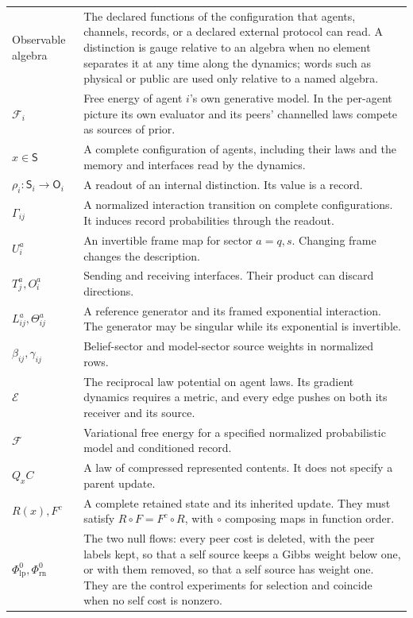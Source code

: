 \begin{longtable}{@{}>{\raggedright\arraybackslash}p{}>{\raggedright\arraybackslash}p{}@{}}
Observable algebra & The declared functions of the configuration that agents, channels, records, or a declared external protocol can read. A distinction is gauge relative to an algebra when no element separates it at any time along the dynamics; words such as physical or public are used only relative to a named algebra.\\
$\mathcal F_i$ & Free energy of agent $i$'s own generative model. In the per-agent picture its own evaluator and its peers' channelled laws compete as sources of prior.\\
$x\in\mathsf S$ & A complete configuration of agents, including their laws and the memory and interfaces read by the dynamics.\\
$\rho_i:\mathsf S_i\to\mathsf O_i$ & A readout of an internal distinction. Its value is a record.\\
$\Gamma_{ij}$ & A normalized interaction transition on complete configurations. It induces record probabilities through the readout.\\
$U_i^a$ & An invertible frame map for sector $a=q,s$. Changing frame changes the description.\\
$T_j^a,O_i^a$ & Sending and receiving interfaces. Their product can discard directions.\\
$L_{ij}^a,\Theta_{ij}^a$ & A reference generator and its framed exponential interaction. The generator may be singular while its exponential is invertible.\\
$\beta_{ij},\gamma_{ij}$ & Belief-sector and model-sector source weights in normalized rows.\\
$\mathcal E$ & The reciprocal law potential on agent laws. Its gradient dynamics requires a metric, and every edge pushes on both its receiver and its source.\\
$\mathcal F$ & Variational free energy for a specified normalized probabilistic model and conditioned record.\\
$Q_xC$ & A law of compressed represented contents. It does not specify a parent update.\\
$R(x),F^c$ & A complete retained state and its inherited update. They must satisfy $R\circ F=F^c\circ R$, with $\circ$ composing maps in function order.\\
$\Phi^0_{\mathrm{lp}},\Phi^0_{\mathrm{rn}}$ & The two null flows: every peer cost is deleted, with the peer labels kept, so that a self source keeps a Gibbs weight below one, or with them removed, so that a self source has weight one. They are the control experiments for selection and coincide when no self cost is nonzero.\\

\end{longtable}
